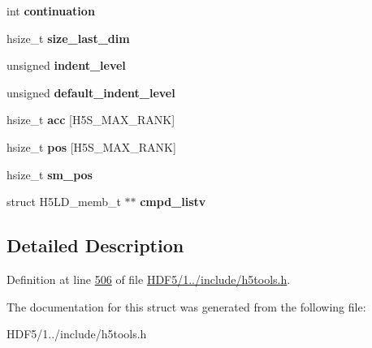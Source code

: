 \begin{DoxyCompactItemize}
\item 
\mbox{\label{structh5tools__context__t_ac2507aefb48c978528f04e7303e110b1}} 
int {\bfseries continuation}
\item 
\mbox{\label{structh5tools__context__t_acdeaf3a340702cb56e621fd79b7c057e}} 
hsize\+\_\+t {\bfseries size\+\_\+last\+\_\+dim}
\item 
\mbox{\label{structh5tools__context__t_a8633d1b839375a080103bd654451f55c}} 
unsigned {\bfseries indent\+\_\+level}
\item 
\mbox{\label{structh5tools__context__t_aaa46a439b15962b9ad420e044bfad6b2}} 
unsigned {\bfseries default\+\_\+indent\+\_\+level}
\item 
\mbox{\label{structh5tools__context__t_a57a20e2a443f2b6a083d9efcc734fdc0}} 
hsize\+\_\+t {\bfseries acc} \mbox{[}H5\+S\+\_\+\+M\+A\+X\+\_\+\+R\+A\+NK\mbox{]}
\item 
\mbox{\label{structh5tools__context__t_a9492fb70db4f77f259109d93b342cc89}} 
hsize\+\_\+t {\bfseries pos} \mbox{[}H5\+S\+\_\+\+M\+A\+X\+\_\+\+R\+A\+NK\mbox{]}
\item 
\mbox{\label{structh5tools__context__t_a1a70528e09af0fe9dc0403f0900268ed}} 
hsize\+\_\+t {\bfseries sm\+\_\+pos}
\item 
\mbox{\label{structh5tools__context__t_adca39c93ad508a99617e6cddd0ce5e02}} 
struct H5\+L\+D\+\_\+memb\+\_\+t $\ast$$\ast$ {\bfseries cmpd\+\_\+listv}
\end{DoxyCompactItemize}


\subsection{Detailed Description}


Definition at line \hyperlink{_h_d_f5_21_810_81_2include_2h5tools_8h_source_l00506}{506} of file \hyperlink{_h_d_f5_21_810_81_2include_2h5tools_8h_source}{H\+D\+F5/1../include/h5tools.\+h}.



The documentation for this struct was generated from the following file\+:\begin{DoxyCompactItemize}
\item 
H\+D\+F5/1../include/h5tools.\+h\end{DoxyCompactItemize}
